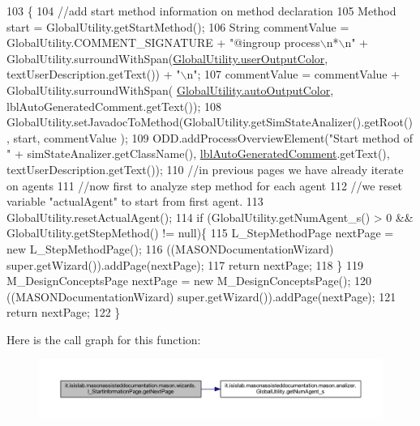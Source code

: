 \begin{DoxyCode}
103                                     \{ 
104         \textcolor{comment}{//add start method information on method declaration}
105         Method start = GlobalUtility.getStartMethod();
106         String commentValue = GlobalUtility.COMMENT\_SIGNATURE +  \textcolor{stringliteral}{"@ingroup process\(\backslash\)n*\(\backslash\)n"} + 
      GlobalUtility.surroundWithSpan(\hyperlink{classit_1_1isislab_1_1masonassisteddocumentation_1_1mason_1_1analizer_1_1_global_utility_a0fcb324ae33eb93bd5b9177e342ecc82}{GlobalUtility.userOutputColor}, textUserDescription.getText()) + \textcolor{stringliteral}{
      "\(\backslash\)n"};
107         commentValue = commentValue + GlobalUtility.surroundWithSpan(
      \hyperlink{classit_1_1isislab_1_1masonassisteddocumentation_1_1mason_1_1analizer_1_1_global_utility_a2e086c8a2d8edf16b2eaf90408832adc}{GlobalUtility.autoOutputColor}, lblAutoGeneratedComment.getText());
108         GlobalUtility.setJavadocToMethod(GlobalUtility.getSimStateAnalizer().getRoot(), start, commentValue
      );
109         ODD.addProcessOverviewElement(\textcolor{stringliteral}{"Start method of "} + simStateAnalizer.getClassName(), 
      \hyperlink{classit_1_1isislab_1_1masonassisteddocumentation_1_1mason_1_1wizards_1_1_i___start_information_page_aca7f53a1faffbca69e3509af27117c2f}{lblAutoGeneratedComment}.getText(), textUserDescription.getText());
110         \textcolor{comment}{//in previous pages we have already iterate on agents}
111         \textcolor{comment}{//now first to analyze step method for each agent}
112         \textcolor{comment}{//we reset variable "actualAgent" to start from first agent.}
113         GlobalUtility.resetActualAgent();
114         \textcolor{keywordflow}{if} (GlobalUtility.getNumAgent\_s() > 0 && GlobalUtility.getStepMethod() != null)\{
115             L\_StepMethodPage nextPage = \textcolor{keyword}{new} L\_StepMethodPage();
116             ((MASONDocumentationWizard) super.getWizard()).addPage(nextPage);
117             \textcolor{keywordflow}{return} nextPage;
118         \}
119         M\_DesignConceptsPage nextPage = \textcolor{keyword}{new} M\_DesignConceptsPage();
120         ((MASONDocumentationWizard) super.getWizard()).addPage(nextPage);
121         \textcolor{keywordflow}{return} nextPage;
122     \}
\end{DoxyCode}


Here is the call graph for this function\-:\nopagebreak
\begin{figure}[H]
\begin{center}
\leavevmode
\includegraphics[width=350pt]{classit_1_1isislab_1_1masonassisteddocumentation_1_1mason_1_1wizards_1_1_i___start_information_page_a8323956a74dd2d72499c515fa1fc04f7_cgraph}
\end{center}
\end{figure}


